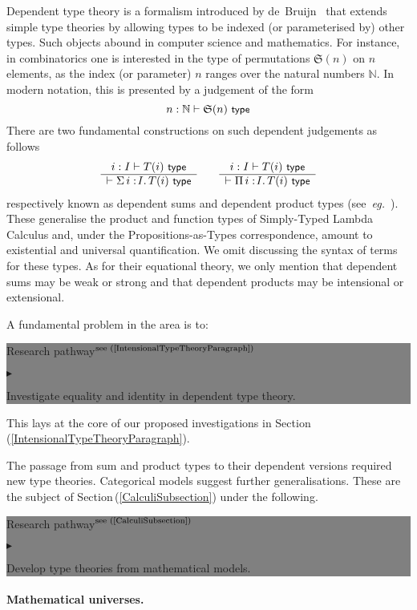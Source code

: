 \documentclass[11pt,twocolumn]{article}
\newenvironment{btritemize}
  {\begin{list}{\btr}
  {\setlength{\topsep}{2pt}
   \setlength{\partopsep}{2pt}
   \setlength{\itemsep}{2.5pt}
   \setlength{\parsep}{2.5pt}
   \setlength{\leftmargin}{1em}
   \setlength{\labelwidth}{.5em}}}
  {\end{list}}
\newcommand{\mysf}{\small\sf}
\newcommand{\mytextsf}[1]{\textsf{\small #1}}
\newcommand{\pref}[1]{\,(\ref{#1})}
\newcommand{\eg}{\emph{eg.}}
\newcommand{\btr}{$\blacktriangleright$}
\newcommand{\reqpsize}{8.113395cm}%
\newcommand{\rep}[2]{\begin{center}\colorbox{grey}{\begin{minipage}{\reqpsize}
  \mytextsf{Research pathway}\hfill$^{\mbox{\scriptsize see #1 }}$\\[-5.5mm]
  \begin{btritemize}
  \item #2
  \end{btritemize}
\end{minipage}}\end{center}}
\begin{document}
Dependent type theory is a formalism introduced by
de~Bruijn~\cite{deBruijn} that extends simple type theories by
allowing types to be indexed (or parameterised by) other types.  Such
objects abound in computer science and mathematics.  For instance, in
combinatorics one is interested in the type of permutations $\mathfrak
S(n)$ on $n$ elements, as the index (or parameter) $n$ ranges over the
natural numbers $\mathbb N$.  In modern notation, this is presented by a
judgement of the form
  \[
  n:\mathbb N \vdash \mathfrak S(n) \mbox{ \mysf type}
\]
There are two fundamental constructions on such dependent judgements as
follows
  \[
  \begin{array}{c}
  i: I \vdash T(i) \mbox{ \mysf type}
  \\ \hline
  \vdash \Sigma\,{i:\!I}.\, T(i) \mbox{ \mysf type}
  \end{array}
  \qquad
  \begin{array}{c}
  i: I \vdash T(i) \mbox{ \mysf type}
  \\ \hline
  \vdash \Pi\,{i:\!I}.\, T(i) \mbox{ \mysf type}
  \end{array}
\]
respectively known as dependent sums and dependent product types
(see~\eg~\cite{Jacobs}).  These generalise the product and function types of
Simply-Typed Lambda Calculus and, under the Propositions-as-Types
correspondence, amount to existential and universal quantification.  We omit
discussing the syntax of terms for these types.  As for their equational
theory, we only mention that dependent sums may be weak or strong and that
dependent products may be intensional or extensional.

A fundamental problem in the area is to:
\rep{(\ref{IntensionalTypeTheoryParagraph})}
  {Investigate equality and identity in dependent type theory.}
This lays at the core of our proposed investigations in
Section\pref{IntensionalTypeTheoryParagraph}.

The passage from sum and product types to their dependent versions
required new type theories.  Categorical models suggest further
generalisations.  These are the subject of
Section\pref{CalculiSubsection}
under the following. 
\rep{(\ref{CalculiSubsection})}
  {Develop type theories from mathematical models.}

\paragraph{Mathematical universes.}
\label{MathematicalUniversesParagraph}
\end{document}
